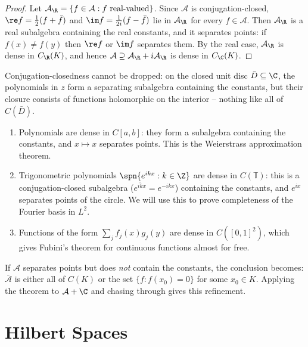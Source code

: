 \begin{proof}
	Let $\mathcal{A}_\R = \{f \in \mathcal{A} : f \text{ real-valued}\}$. Since $\mathcal A$ is conjugation-closed, $\re f = \frac12(f + \bar f)$ and $\im f = \frac{1}{2i}(f-\bar f)$ lie in $\mathcal{A}_\R$ for every $f \in \mathcal A$. Then $\mathcal{A}_\R$ is a real subalgebra containing the real constants, and it separates points: if $f(x)\neq f(y)$ then $\re f$ or $\im f$ separates them. By the real case, $\mathcal{A}_\R$ is dense in $C_\R(K)$, and hence $\mathcal{A} \supseteq \mathcal{A}_\R + i\mathcal{A}_\R$ is dense in $C_\C(K)$.
\end{proof}

Conjugation-closedness cannot be dropped: on the closed unit disc $\bar D \subseteq \C$, the polynomials in $z$ form a separating subalgebra containing the constants, but their closure consists of functions holomorphic on the interior -- nothing like all of $C(\bar D)$.

\begin{example}
	\begin{enumerate}[label=(\roman*)]
		\item Polynomials are dense in $C[a,b]$: they form a subalgebra containing the constants, and $x \mapsto x$ separates points. This is the Weierstrass approximation theorem.
		\item Trigonometric polynomials $\spn\{e^{ikx} : k \in \Z\}$ are dense in $C(\mathbb{T})$: this is a conjugation-closed subalgebra ($\overline{e^{ikx}} = e^{-ikx}$) containing the constants, and $e^{ix}$ separates points of the circle. We will use this to prove completeness of the Fourier basis in $L^2$.
		\item Functions of the form $\sum_{j} f_j(x)g_j(y)$ are dense in $C([0,1]^2)$, which gives Fubini's theorem for continuous functions almost for free.
	\end{enumerate}
\end{example}

\begin{remark}
	If $\mathcal A$ separates points but does \emph{not} contain the constants, the conclusion becomes: $\bar{\mathcal A}$ is either all of $C(K)$ or the set $\{f : f(x_0)=0\}$ for some $x_0 \in K$. Applying the theorem to $\mathcal{A}+\C$ and chasing through gives this refinement.
\end{remark}

\section{Hilbert Spaces}

